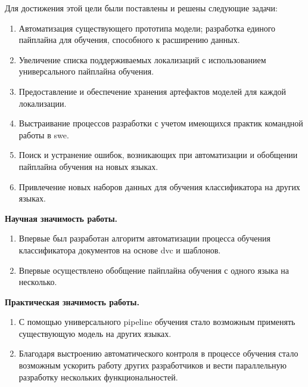 Для достижения этой цели были поставлены и решены следующие задачи:
\begin{enumerate}
    \item Автоматизация существующего прототипа модели; разработка единого пайплайна для обучения, способного к расширению данных.
    \item Увеличение списка поддерживаемых локализаций с использованием универсального пайплайна обучения.
    \item Предоставление и обеспечение хранения артефактов моделей для каждой локализации.
    \item Выстраивание процессов разработки с учетом имеющихся практик командной работы в \gls{swe}.
    \item Поиск и устранение ошибок, возникающих при автоматизации и обобщении пайплайна обучения на новых языках.
    \item Привлечение новых наборов данных для обучения классификатора на других языках.
\end{enumerate}

\textbf{Научная значимость работы.}
\begin{enumerate}
    \item Впервые был разработан алгоритм автоматизации процесса обучения классификатора документов на основе \gls{dvc} и шаблонов.
    \item Впервые осуществлено обобщение пайплайна обучения с одного языка на несколько.
\end{enumerate}

\textbf{Практическая значимость работы.}
\begin{enumerate}
    \item С помощью универсального \gls{pipeline} обучения стало возможным применять существующую модель на других языках.
    \item Благодаря выстроению автоматического контроля в процессе обучения стало возможным ускорить работу других разработчиков и вести параллельную разработку нескольких функциональностей.
\end{enumerate}
